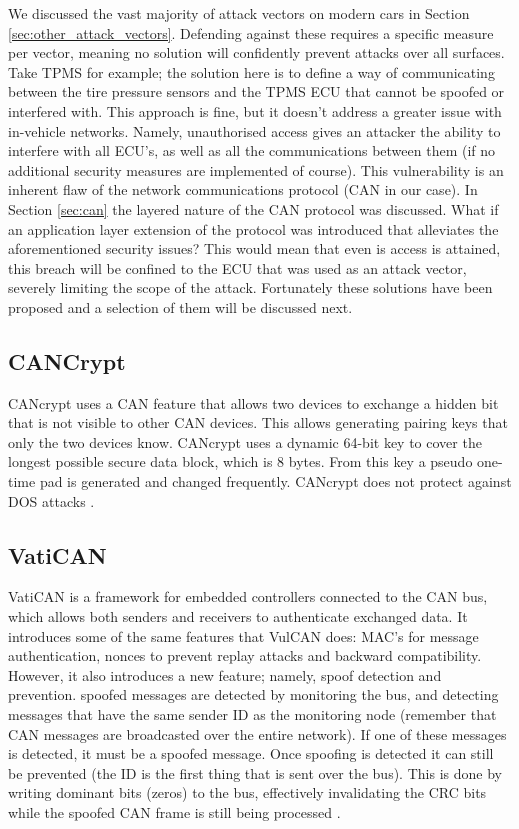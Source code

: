 We discussed the vast majority of attack vectors on modern cars in Section \ref{sec:other_attack_vectors}. Defending against these requires a specific measure per vector, meaning no solution will confidently prevent attacks over all surfaces. Take TPMS for example; the solution here is to define a way of communicating between the tire pressure sensors and the TPMS ECU that cannot be spoofed or interfered with. This approach is fine, but it doesn't address a greater issue with in-vehicle networks. Namely, unauthorised access gives an attacker the ability to interfere with all ECU's, as well as all the communications between them (if no additional security measures are implemented of course). This vulnerability is an inherent flaw of the network communications protocol (CAN in our case). In Section \ref{sec:can} the layered nature of the CAN protocol was discussed. What if an application layer extension of the protocol was introduced that alleviates the aforementioned security issues? This would mean that even is access is attained, this breach will be confined to the ECU that was used as an attack vector, severely limiting the scope of the attack. Fortunately these solutions have been proposed and a selection of them will be discussed next.

\subsection{CANCrypt}
\label{subsec:cancrypt}

CANcrypt uses a CAN feature that allows two devices to exchange a hidden bit that is not visible to other CAN devices. This allows generating pairing keys that only the two devices know. CANcrypt uses a dynamic 64-bit key to cover the longest possible secure data block, which is 8 bytes. From this key a pseudo one-time pad is generated and changed frequently. CANcrypt does not protect against DOS attacks \cite{Pfeiffer}.

\subsection{VatiCAN} 
\label{subsec:vatican}

VatiCAN is a framework for embedded controllers connected to the CAN bus, which allows both senders and receivers to authenticate exchanged data. It introduces some of the same features that VulCAN does: MAC's for message authentication, nonces to prevent replay attacks and backward compatibility. However, it also introduces a new feature; namely, spoof detection and prevention. spoofed messages are detected by monitoring the bus, and detecting messages that have the same sender ID as the monitoring node (remember that CAN messages are broadcasted over the entire network). If one of these messages is detected, it must be a spoofed message. Once spoofing is detected it can still be prevented (the ID is the first thing that is sent over the bus). This is done by writing dominant bits (zeros) to the bus, effectively invalidating the CRC bits while the spoofed CAN frame is still being processed \cite{VatiCAN}.

